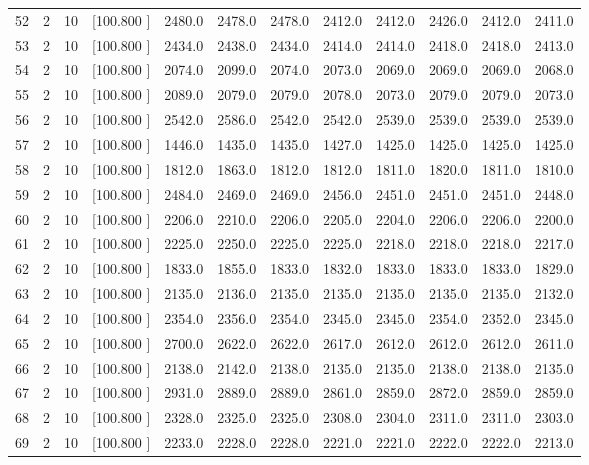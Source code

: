 \documentclass[12pt,a4paper]{article}
\begin{document}
\begin{center}
{\begin{tabular}{r r r r r r r r r r r r}
  52&  2& 10&[100.800   ]&  2480.0&  2478.0&  2478.0&  2412.0&  2412.0&  2426.0&  2412.0&  2411.0\\[-0.02in]
  53&  2& 10&[100.800   ]&  2434.0&  2438.0&  2434.0&  2414.0&  2414.0&  2418.0&  2418.0&  2413.0\\[-0.02in]
  54&  2& 10&[100.800   ]&  2074.0&  2099.0&  2074.0&  2073.0&  2069.0&  2069.0&  2069.0&  2068.0\\[-0.02in]
  55&  2& 10&[100.800   ]&  2089.0&  2079.0&  2079.0&  2078.0&  2073.0&  2079.0&  2079.0&  2073.0\\[-0.02in]
  56&  2& 10&[100.800   ]&  2542.0&  2586.0&  2542.0&  2542.0&  2539.0&  2539.0&  2539.0&  2539.0\\[-0.02in]
  57&  2& 10&[100.800   ]&  1446.0&  1435.0&  1435.0&  1427.0&  1425.0&  1425.0&  1425.0&  1425.0\\[-0.02in]
  58&  2& 10&[100.800   ]&  1812.0&  1863.0&  1812.0&  1812.0&  1811.0&  1820.0&  1811.0&  1810.0\\[-0.02in]
  59&  2& 10&[100.800   ]&  2484.0&  2469.0&  2469.0&  2456.0&  2451.0&  2451.0&  2451.0&  2448.0\\[-0.02in]
  60&  2& 10&[100.800   ]&  2206.0&  2210.0&  2206.0&  2205.0&  2204.0&  2206.0&  2206.0&  2200.0\\[-0.02in]
  61&  2& 10&[100.800   ]&  2225.0&  2250.0&  2225.0&  2225.0&  2218.0&  2218.0&  2218.0&  2217.0\\[-0.02in]
  62&  2& 10&[100.800   ]&  1833.0&  1855.0&  1833.0&  1832.0&  1833.0&  1833.0&  1833.0&  1829.0\\[-0.02in]
  63&  2& 10&[100.800   ]&  2135.0&  2136.0&  2135.0&  2135.0&  2135.0&  2135.0&  2135.0&  2132.0\\[-0.02in]
  64&  2& 10&[100.800   ]&  2354.0&  2356.0&  2354.0&  2345.0&  2345.0&  2354.0&  2352.0&  2345.0\\[-0.02in]
  65&  2& 10&[100.800   ]&  2700.0&  2622.0&  2622.0&  2617.0&  2612.0&  2612.0&  2612.0&  2611.0\\[-0.02in]
  66&  2& 10&[100.800   ]&  2138.0&  2142.0&  2138.0&  2135.0&  2135.0&  2138.0&  2138.0&  2135.0\\[-0.02in]
  67&  2& 10&[100.800   ]&  2931.0&  2889.0&  2889.0&  2861.0&  2859.0&  2872.0&  2859.0&  2859.0\\[-0.02in]
  68&  2& 10&[100.800   ]&  2328.0&  2325.0&  2325.0&  2308.0&  2304.0&  2311.0&  2311.0&  2303.0\\[-0.02in]
  69&  2& 10&[100.800   ]&  2233.0&  2228.0&  2228.0&  2221.0&  2221.0&  2222.0&  2222.0&  2213.0\\[-0.02in]

\end{tabular}}
\end{center}
\end{document}
